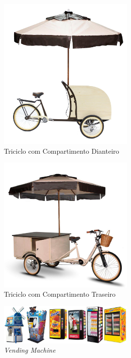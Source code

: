 \begin{figure}[H]
	\centering
    \includegraphics[width=0.6\textwidth]{figuras/exemplo2}
    \caption{Triciclo com Compartimento Dianteiro}
    \label{fig:exemplo2}
\end{figure}

\begin{figure}[H]
	\centering
    \includegraphics[width=0.6\textwidth]{figuras/exemplo}
    \caption{Triciclo com Compartimento Traseiro}
    \label{fig:exemplo}
\end{figure}

\begin{figure}[H]
	\centering
    \includegraphics[width=0.6\textwidth]{figuras/machinewrapsheader}
    \caption{\textit{Vending Machine}}
    \label{fig:machinewrapsheader}
\end{figure}

